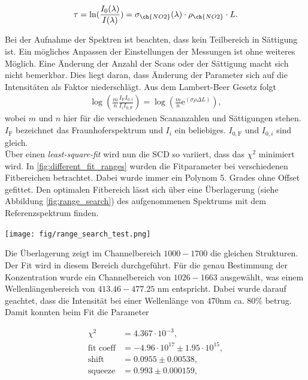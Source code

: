 \documentclass[12pt, a4paper, bibliography=totoc]{scrartcl}
\begin{document}
\begin{multicols}{2}
\begin{align}
\tau = \ln(\frac{I_0(\lambda)}{I(\lambda)}) = \sigma_{\ch{NO2}}(\lambda) \cdot \rho_{\ch{NO2}} \cdot L.
\end{align}

Bei der Aufnahme der Spektren ist beachten, dass kein Teilbereich in Sättigung ist. 
Ein mögliches Anpassen der Einstellungen der Messungen ist ohne weiteres Möglich. 
Eine Änderung der Anzahl der Scans oder der Sättigung macht sich nicht bemerkbar.
Dies liegt daran, dass Änderung der Parameter sich auf die Intensitäten als Faktor niederschlägt. 
Aus dem Lambert-Beer Gesetz folgt
\begin{align}
    \log \left( \frac{m}{n} \frac{I_\text{F} I_{0, i}}{I_i I_{0, \text{F}}} \right) = \log \left(\frac{m}{n} \text{e}^{(\sigma \rho \Delta L)}\right) ,
\end{align}
wobei $m$ und $n$ hier für die verschiedenen Scananzahlen und Sättigungen stehen. 
$I_\text{F}$ bezeichnet das Fraunhoferspektrum und $I_i$ ein beliebiges.
$I_{0, \text{F}}$ und $I_{0, i}$ sind gleich.
\\
Über einen \textit{least-square-fit} wird nun die SCD so variiert, dass das $\chi^2$ minimiert wird. 
In \ref{fig:different_fit_ranges} wurden die Fitparameter bei verschiedenen Fitbereichen betrachtet. 
Dabei wurde immer ein Polynom 5. Grades ohne Offset gefittet.
Den optimalen Fitbereich lässt sich über eine Überlagerung (siehe Abbildung \ref{fig:range_search}) des aufgenommenen Spektrums mit dem  Referenzspektrum finden.

\begin{center}
	\texttt{[image: fig/range\_search\_test.png]}
	\label{fig:range_search}
\end{center}

Die Überlagerung zeigt im Channelbereich $1000-1700$ die gleichen Strukturen. Der Fit wird in diesem Bereich durchgeführt.
Für die genau Bestimmung der  Konzentration wurde ein Channelbereich von $1026-1663$ ausgewählt, was einem Wellenlängenbereich von $413.46 - 477.25$ \si{nm} entspricht.
Dabei wurde darauf geachtet, dass die Intensität bei einer Wellenlänge von $470$\si{nm} ca. $80$\% betrug.
Damit konnten beim Fit die Parameter

\begin{align}
	\chi^2 &= 4.367 \cdot 10^{-3},\\
    \text{fit coeff} &= -4.96 \cdot 10^{17} \pm 1.95 \cdot 10^{15},\\
    \text{shift} &= 0.0955 \pm 0.00538,\\
    \text{squeeze} &= 0.993 \pm 0.000159, 
\end{align}


\end{multicols}
\end{document}
